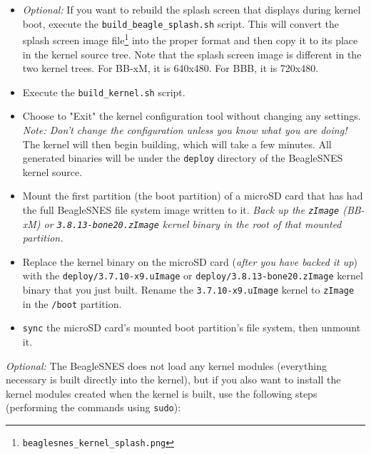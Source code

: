 \begin{itemize}
\item \emph{Optional:} If you want to rebuild the splash screen that displays during kernel boot, execute the \texttt{build\_beagle\_splash.sh} script.  This will convert the splash screen image file\footnote{\texttt{beaglesnes\_kernel\_splash.png}} into the proper format and then copy it to its place in the kernel source tree.  Note that the splash screen image is different in the two kernel trees.  For BB-xM, it is 640x480.  For BBB, it is 720x480.
\item Execute the \texttt{build\_kernel.sh} script.
\item Choose to "Exit" the kernel configuration tool without changing any settings.  \emph{Note: Don't change the configuration unless you know what you are doing!}  The kernel will then begin building, which will take a few minutes.  All generated binaries will be under the \texttt{deploy} directory of the BeagleSNES kernel source.
\item Mount the first partition (the boot partition) of a microSD card that has had the full BeagleSNES file system image written to it.  \emph{Back up the \texttt{zImage} (BB-xM) or \texttt{3.8.13-bone20.zImage} kernel binary in the root of that mounted partition.} 
\item Replace the kernel binary on the microSD card (\emph{after you have backed it up}) with the \texttt{deploy/3.7.10-x9.uImage} or \texttt{deploy/3.8.13-bone20.zImage} kernel binary that you just built. Rename the \texttt{3.7.10-x9.uImage} kernel to \texttt{zImage} in the \texttt{/boot} partition.
\item \texttt{sync} the microSD card's mounted boot partition's file system, then unmount it. 
\end{itemize}

\noindent{}\emph{Optional:} The BeagleSNES does not load any kernel modules (everything necessary is built directly into the kernel), but if you also want to install the kernel modules created when the kernel is built, use the following steps (performing the commands using \texttt{sudo}):

